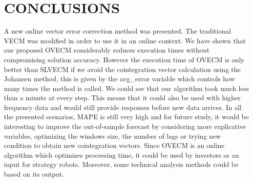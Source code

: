 \section{\uppercase{Conclusions}}
\label{sec:conclusions}
\noindent A new online vector error correction method was presented. The traditional VECM
was modified in order to use it in an online context. We have shown that our
proposed OVECM considerably reduces execution times without compromising
solution accuracy.  However the execution time of OVECM is only better than
SLVECM if we avoid the cointegration vector calculation using the Johansen
method, this is given by the avg\_error variable which controls how many times
the method is called.  We could see that our algorithm took much less than a
minute at every step. This means that it could also be used with higher
frequency data and would still provide responses before new data arrives. 
In all the presented scenarios, MAPE is still very high and for future
study, it would be interesting to improve the out-of-sample forecast by
considering more explicative variables, optimizing the windows size, the
number of lags or trying new condition to obtain new cointegration vectors.
Since OVECM is an online algorithm which optimizes processing time, it could be
used by investors as an input for strategy robots. Moreover, some technical
analysis methods could be based on its output. 
